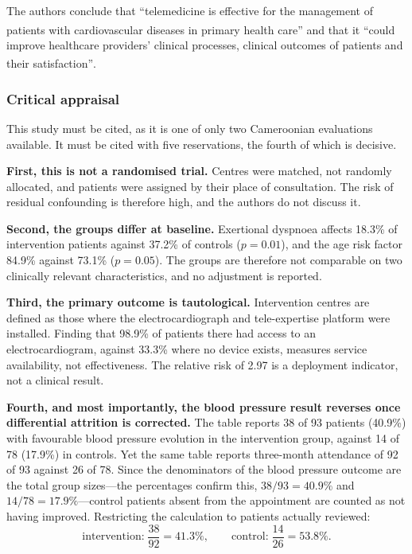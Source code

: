 \documentclass[12pt,a4paper,oneside]{report}
\newcommand{\bq}[1]{``#1''\textsuperscript{\dag}}
\begin{document}
The authors conclude that \bq{telemedicine is effective for the management of patients with cardiovascular diseases in primary health care} and that it \bq{could improve healthcare providers' clinical processes, clinical outcomes of patients and their satisfaction}.

\subsubsection{Critical appraisal}\label{sec:bediang-appraisal}

This study must be cited, as it is one of only two Cameroonian evaluations available. It must be cited with five reservations, the fourth of which is decisive.

\textbf{First, this is not a randomised trial.} Centres were matched, not randomly allocated, and patients were assigned by their place of consultation. The risk of residual confounding is therefore high, and the authors do not discuss it.

\textbf{Second, the groups differ at baseline.} Exertional dyspnoea affects 18.3\% of intervention patients against 37.2\% of controls ($p = 0.01$), and the age risk factor 84.9\% against 73.1\% ($p = 0.05$). The groups are therefore not comparable on two clinically relevant characteristics, and no adjustment is reported.

\textbf{Third, the primary outcome is tautological.} Intervention centres are defined as those where the electrocardiograph and tele-expertise platform were installed. Finding that 98.9\% of patients there had access to an electrocardiogram, against 33.3\% where no device exists, measures service availability, not effectiveness. The relative risk of 2.97 is a deployment indicator, not a clinical result.

\textbf{Fourth, and most importantly, the blood pressure result reverses once differential attrition is corrected.} The table reports 38 of 93 patients (40.9\%) with favourable blood pressure evolution in the intervention group, against 14 of 78 (17.9\%) in controls. Yet the same table reports three-month attendance of 92 of 93 against 26 of 78. Since the denominators of the blood pressure outcome are the total group sizes---the percentages confirm this, $38/93 = 40.9\%$ and $14/78 = 17.9\%$---control patients absent from the appointment are counted as not having improved. Restricting the calculation to patients actually reviewed:
\begin{equation}
  \text{intervention:} \; \frac{38}{92} = 41.3\%, \qquad
  \text{control:} \; \frac{14}{26} = 53.8\%.
\end{equation}
\end{document}
